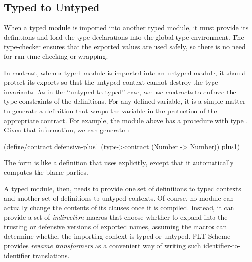 \begin{schemeregion}
\subsection{Typed to Untyped}

When a typed module is imported into another typed module, it must
provide its definitions and load the type declarations into the global
type environment.  The type-checker ensures that the exported values
are used safely, so there is no need for run-time checking or
wrapping.

In contrast, when a typed module is imported into an untyped module,
it should protect its exports so that the untyped context cannot
destroy the type invariants. As in the ``untyped to typed'' case, we use
contracts to enforce the type constraints of the definitions. For any
defined variable, it is a simple matter to generate a definition that
wraps the variable in the protection of the appropriate contract.
%
For example, the  module above has a 
procedure with type . Given that information,
we can generate :

\begin{schemedisplay}
(define/contract defensive-plus1
    (type->contract (Number -> Number))
  plus1)
\end{schemedisplay}
\noindent
The  form is like a definition that uses
 explicitly, except that it automatically computes
the blame parties.

A typed module, then, needs to provide one set of definitions to typed
contexts and another set of definitions to untyped contexts.
%
Of course, no module can actually change the contents of its
 clauses once it is compiled. Instead, it can provide
a set of \emph{indirection} macros that choose whether to expand into
the trusting or defensive versions of exported names, assuming the macros
can determine whether the importing context is typed or untyped. PLT
Scheme provides \emph{rename transformers} as a convenient way of
writing such identifier-to-identifier translations.


\end{schemeregion}
